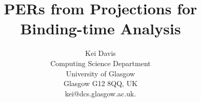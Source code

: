 \newcount\isrr          %
\def\theisrr{\the\isrr}


\newcommand{\progsize}{\normalsize}
\newcommand{\typescriptstyle}{\scriptscriptstyle}
\newcommand{\subtypesize}{\scriptsize}
\newcommand{\subtypespace}{\hspace{0.0pt}}
\newcommand{\subtypesubstyle}{\scriptstyle}             %

\newcommand{\com}{\newcommand}
\com{\rcom}{\renewcommand}





\com{\fig}[4]{
\begin{figure}[#1]
\begin{center}
\begin{minipage}{\columnwidth}
\rule[1ex]{\textwidth}{1pt}
#4
\caption{#2 \label{#3}}
\vspace{1ex}
\rule[1ex]{\textwidth}{1pt}
\end{minipage}
\end{center}
\end{figure}
}

\com{\backup}{\hspace{-0.12cm}}
\rcom{\espace}{\vspace{4pt}}
\com{\itt}[1]{\mbox{\it #1}}
\com{\Ps}{\sf{P}}

\com{\OUTC}{\itt{OUTC}}
\com{\SEL}{\itt{SEL}}
\com{\SPINE}{\itt{SPINE}}
\com{\LBR}{\itt{LBR}}

\sloppy

\pagestyle{empty}



\thispagestyle{empty}

\title{PERs from Projections for Binding-time Analysis}

\author{Kei Davis\\Computing Science Department\\
        University of Glasgow\\
        Glasgow G12 8QQ, UK\\
        kei@dcs.glasgow.ac.uk.}

